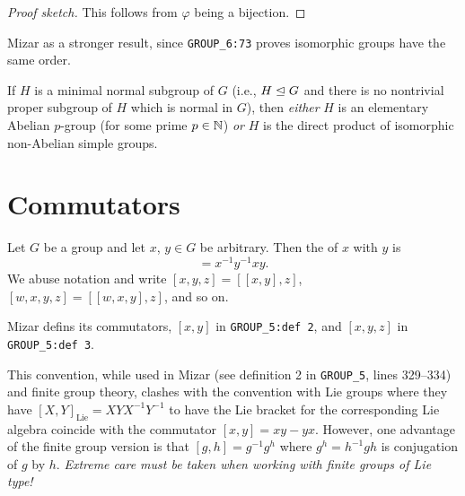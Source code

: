 \begin{proof}[Proof sketch]
This follows from $\varphi$ being a bijection.
\end{proof}

\begin{remark}
Mizar as a stronger result, since \verb#GROUP_6:73# proves isomorphic
groups have the same order.
\end{remark}

\begin{theorem}
  If $H$ is a minimal normal subgroup of $G$ (i.e., $H\trianglelefteq G$
  and there is no nontrivial proper subgroup of $H$ which is normal in
  $G$),
  then \emph{either} $H$ is an elementary Abelian $p$-group (for some
  prime $p\in\mathbb{N}$) \emph{or} $H$ is the direct product of isomorphic
  non-Abelian simple groups.
\end{theorem}

\section{Commutators}

\begin{definition}
  Let $G$ be a group and let $x$, $y\in G$ be arbitrary.
  Then the  of $x$ with $y$ is
  \begin{equation*}
    [x,y] = x^{-1}y^{-1}xy.
  \end{equation*}
  We abuse notation and write $[x,y,z] = [{[x,y]},z]$,
  $[w,x,y,z] = [{[w,x,y]},z]$, and so on.
\end{definition}

\begin{remark}
Mizar defins its commutators, $[x,y]$ in \verb#GROUP_5:def 2#, and
$[x,y,z]$ in \verb#GROUP_5:def 3#.
\end{remark}

\begin{remark}
This convention, while used in Mizar (see definition 2 in \verb#GROUP_5#,
lines 329--334) and finite group theory, clashes with the convention
with Lie groups where they have $[X,Y]_{\text{Lie}}=XYX^{-1}Y^{-1}$ to
have the Lie bracket for the corresponding Lie algebra coincide with the
commutator $[x,y] = xy - yx$. However, one advantage of the finite group
version is that $[g,h] = g^{-1}g^{h}$ where $g^{h}=h^{-1}gh$ is
conjugation of $g$ by $h$. \emph{Extreme care must be taken when working
with finite groups of Lie type!}
\end{remark}

